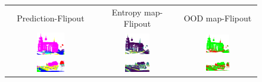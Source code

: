         \begin{figure}[h!]
            \centering
            \begin{tabular}{ccc}
                Prediction-Flipout & Entropy map-Flipout & OOD map-Flipout \\
                \includegraphics[width=0.33\textwidth, height=0.18\textheight]{images/ood_imgs/fout_sem3d/fout_1.png} &
                \includegraphics[width=0.33\textwidth, height=0.18\textheight]{images/ood_imgs/fout_sem3d/fout_ent_1.png}& 
                \includegraphics[width=0.33\textwidth, height=0.18\textheight]{images/ood_imgs/fout_sem3d/fout_ent_ood_auroc_1.png}\\

                \includegraphics[width=0.33\textwidth, height=0.18\textheight]{images/ood_imgs/fout_sem3d/fout_2.png} &
                \includegraphics[width=0.33\textwidth, height=0.18\textheight]{images/ood_imgs/fout_sem3d/fout_ent_2.png}& 
                \includegraphics[width=0.33\textwidth, height=0.18\textheight]{images/ood_imgs/fout_sem3d/fout_ent_ood_auroc_2.png}\\
    

\end{tabular}
\end{figure}
